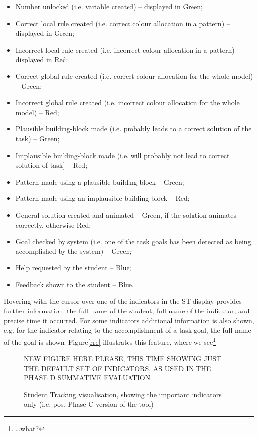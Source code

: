 \begin{itemize}
        	\item Number unlocked (i.e. variable created) – displayed in Green;
        	\item Correct local rule created (i.e. correct colour
              allocation in a pattern) – displayed in Green;
        	\item Incorrect local rule created (i.e. incorrect colour
              allocation in a pattern) – displayed in Red;
        	\item Correct global rule created (i.e. correct colour
              allocation for the whole model) – Green;
        	\item Incorrect global rule created (i.e. incorrect colour
              allocation for the whole model) – Red;
        	\item Plausible building-block made (i.e. probably leads
              to a correct solution of the task) – Green;
        	\item Implausible building-block made (i.e. will probably
              not lead to correct solution of task) – Red;
        	\item Pattern made using a plausible building-block – Green; 
        	\item Pattern made using an implausible building-block –
              Red;
        	\item General solution created and animated – Green, if
              the solution animates correctly, otherwise Red;
        	\item Goal checked by system (i.e. one of the task goals
              has been detected as being accomplished by the system) –
              Green;
        	\item Help requested by the student – Blue; 
        	\item Feedback shown to the student – Blue.
  \end{itemize}
 
Hovering with the cursor over one of the indicators in the ST display
provides further  information: the full name of the student, full name
of the indicator, and precise time it occurred. For some indicators
additional information is also shown, e.g. for the indicator relating
to the accomplishment of a task goal, the full name of the goal is
shown.  Figure\ref{rre} illustrates this feature, where we
see\footnote{\ldots what?}

\begin{figure}[htbp]
  \centering 
  NEW FIGURE HERE PLEASE, THIS TIME SHOWING JUST THE
  DEFAULT SET OF INDICATORS, AS USED IN THE PHASE D SUMMATIVE
  EVALUATION
  \caption{Student Tracking visualisation, showing the important
    indicators only (i.e. post-Phase C version of the tool)}
  \label{fig:stex}
\end{figure}

